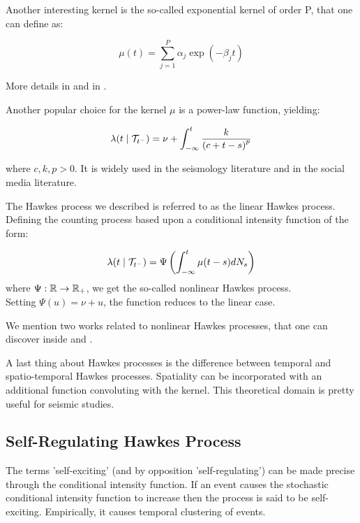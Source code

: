 \documentclass[11pt]{book}
\begin{document}
\begin{remarque}
Another interesting kernel is the so-called exponential kernel of order P, that one can define as:

$$ \mu (t) = \sum_{j=1}^P \alpha_j \exp( - \beta_j t ) $$

More details in \cite{exphawkes} and in \cite{exphawkes2}.
\end{remarque}

\begin{remarque}
Another popular choice for the kernel $\mu$ is a power-law function, yielding:

$$ \lambda (t \mid \mathcal{T}_{t^-} ) = \nu + \int_{- \infty }^t \frac{ k }{ \left ( c + t - s \right ) ^p } $$

where $c,k,p > 0$. It is widely used in the seismology literature and in the social media literature.
\end{remarque}




\begin{remarque}
The Hawkes process we described is referred to as the linear Hawkes process. Defining the counting process based upon a conditional intensity function of the form:

$$ \lambda (t \mid \mathcal{T}_{t^-}) = \Psi \left ( \int_{-\infty}^t \mu(t-s) dN_s \right ) $$ where $\Psi : \mathbb{R} \to \mathbb{R}_+$, we get the so-called nonlinear Hawkes process. \\Setting $\Psi(u) = \nu + u$, the function reduces to the linear case. 

We mention two works related to nonlinear Hawkes processes, that one can discover inside \cite{nonlinearHP1} and \cite{nonlinearHP2}.
\end{remarque}

\begin{remarque}
A last thing about Hawkes processes is the difference between temporal and spatio-temporal Hawkes processes. Spatiality can be incorporated with an additional function convoluting with the kernel. This theoretical domain is pretty useful for seismic studies.
\end{remarque}



\subsection{Self-Regulating Hawkes Process}
\label{section:obral}

The terms 'self-exciting'  (and by opposition 'self-regulating') can be made precise through the conditional intensity function. If an event causes the stochastic conditional intensity function to increase then the process is said to be self-exciting. Empirically, it causes temporal clustering of events. 
\end{document}
